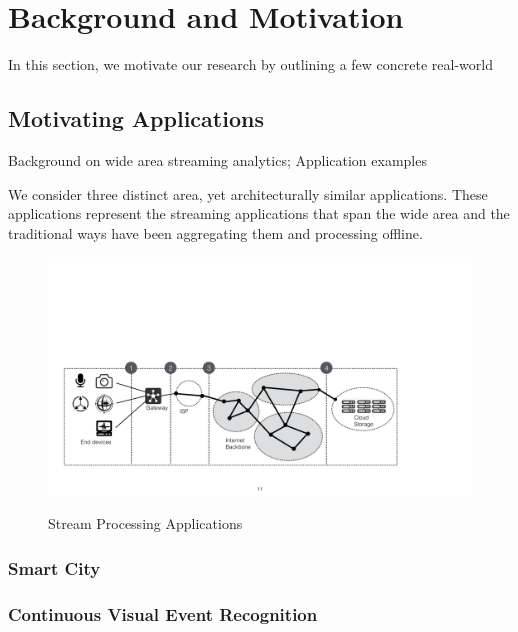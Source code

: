 \section{Background and Motivation}
\label{sec:background-motivation}

In this section, we motivate our research by outlining a few concrete real-world

\subsection{Motivating Applications}
\label{sec:motiv-appl}

Background on wide area streaming analytics; Application examples

We consider three distinct area, yet architecturally similar applications. These
applications represent the streaming applications that span the wide area and
the traditional ways have been aggregating them and processing offline.

\begin{figure}
  \centering
  \includegraphics[width=.95\linewidth]{figures/model.pdf}
  \label{fig:app-model}
  \caption{Stream Processing Applications}
\end{figure}

\subsubsection{Smart City}
\label{sec:smart-city}


\subsubsection{Continuous Visual Event Recognition}
\label{sec:cont-visu-event}

